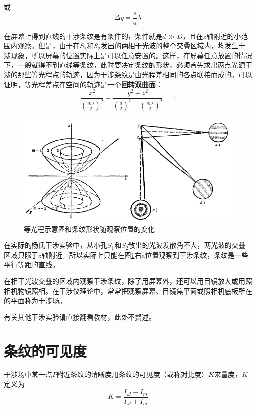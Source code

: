 \documentclass[UTF8]{ctexart}
\begin{document}
\noindent 或
\begin{equation}
	\Delta y=\frac{s}{a} \lambda
\end{equation}

	在屏幕上得到直线的干涉条纹是有条件的，条件就是$ d \gg D $，且在$ z $轴附近的小范围内观察。但是，由于在$ S_{1} $和$ S_{2} $发出的两相干光波的整个交叠区域内，均发生干涉现象，所以屏幕的位置实际上是可以任意安置的。这样，在屏幕任意放置的情况下，一般就得不到直线等条纹，此时要决定条纹的形状，必须首先求出两点光源干涉的那些等光程点的轨迹，因为干涉条纹是由光程差相同的各点联接而成的。可以证明，等光程差点在空间的轨迹是一个\textbf{回转双曲面}：
	\begin{equation}
	\frac{x^{2}}{\left(\frac{m \lambda}{2}\right)^{2}}-\frac{y^{2}+z^{2}}{\left(\frac{d}{2}\right)^{2}-\left(\frac{m \lambda}{2}\right)^{2}}=1
	\end{equation}
	
	\begin{figure}[h]
		\centering
		\includegraphics[width=12cm]{Interference1.png}
		\caption{等光程示意图和条纹形状随观察位置的变化}
		\label{figure_Interference1}
	\end{figure}

	在实际的杨氏干涉实验中，从小孔$ S_{1} $和$ S_{2} $散出的光波发散角不大，两光波的交叠区域只限于$ z $轴附近，所以实际上只能在图\ref{figure_Interference1}右a位置观察到干涉条纹，条纹是一些平行等距的直线。
	
	在相干光波交叠的区域内观察干涉条纹，除了用屏幕外，还可以用目镜放大或用照相机物镜照相。在干涉仪理论中，常常把观察屏幕、目镜焦平面或照相机底板所在的平面称为干涉场。
	
	有关其他干涉实验请直接翻看教材，此处不赘述。
	
	\section{条纹的可见度}
	干涉场中某一点$ P $附近条纹的清晰度用条纹的可见度（或称对比度）$ K $来量度，$ K $定义为
	\begin{equation}
	K=\frac{I_{M}-I_{m}}{I_{M}+I_{m}}\label{equ_K}
	\end{equation}
	
\end{document}
